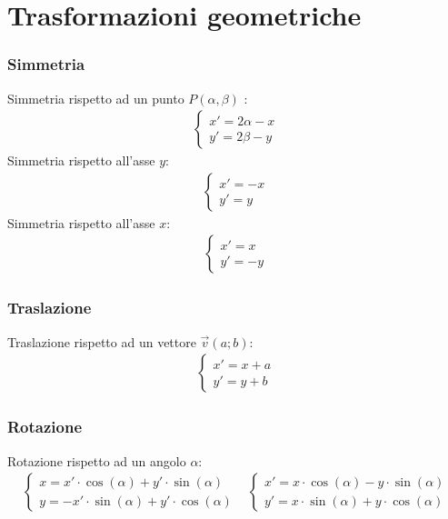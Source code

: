 \documentclass[a4paper]{article}
\begin{document}
	
	
	\newpage	
	\section{Trasformazioni geometriche}
	\subsubsection{Simmetria}
	 Simmetria rispetto ad un punto $P(\alpha , \beta)$ :
	 \begin{align*}
	 	\begin{cases}
	 	x' = 2 \alpha - x \\
	 	y' = 2 \beta -y 
	 	\end{cases}
	 \end{align*}
	 Simmetria rispetto all'asse $y$:
	 \begin{align*}
	 	\begin{cases}
	 	x' = -x\\
	 	y' = y
	 	\end{cases}
	 \end{align*}
	Simmetria rispetto all'asse $x$:
	\begin{align*}
		\begin{cases}
			x' = x\\
			y' = -y
		\end{cases}
	\end{align*}
	
	\subsubsection{Traslazione}
	Traslazione rispetto ad un vettore $\vec{v} (a;b)$:
	\begin{align*}
		\begin{cases}
			x'=x+a\\
			y'=y+b
		\end{cases}
	\end{align*}
	
	\subsubsection{Rotazione}
	Rotazione rispetto ad un angolo $\alpha$:
	\begin{align*}
		\begin{cases}
			x=x' \cdot \cos (\alpha) + y' \cdot \sin(\alpha)\\
			y= -x' \cdot \sin (\alpha) + y' \cdot \cos(\alpha)
		\end{cases}&
		\begin{cases}
			x'= x \cdot \cos (\alpha) - y \cdot \sin(\alpha)\\
			y'= x \cdot \sin (\alpha) + y \cdot \cos(\alpha)
		\end{cases}
	\end{align*}
\end{document}
